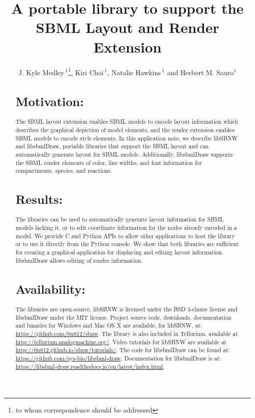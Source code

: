 \documentclass{bioinfo}
\begin{document}

\title[SBML Layout Library]{A portable library to support the SBML Layout and Render Extension}
\author[Medley \textit{et~al}]{J. Kyle Medley\,$^{1}$\footnote{to whom correspondence should be addressed}, Kiri Choi\,$^{1}$, Natalie Hawkins\,$^{1}$ and Herbert M. Sauro$^{1}$ }
\address{$^{1}$Department of Bioengineering, University of Washington, Seattle, WA 98195, USA.}

\maketitle

\begin{abstract}

\section{Motivation:}
The SBML layout extension enables SBML models to encode layout information which describes the graphical depiction of model 
elements, and the render extension enables SBML models to encode 
style elements. In this application note, we describe libSBNW 
and libsbmlDraw, portable libraries that support the SBML layout 
and can automatically generate layout for SBML models.  
Additionally, libsbmlDraw supports the SBML render elements 
of color, line widths, and font information for compartments, 
species, and reactions. 

\section{Results:}
The libraries can be used to automatically generate layout information for SBML models lacking it, or to edit coordinate information for the nodes already encoded in a model. We provide C and Python APIs to allow other applications to host the library or to use it directly from the Python console.  We show that both libraries are sufficient for creating a graphical application for displaying and editing layout information.  libsbmlDraw allows editing of render information.

\section{Availability:}
The libraries are open-source, libSBNW is licensed under the BSD 3-clause license and libsbmlDraw under the MIT license. Project source code, downloads, documentation and binaries for Windows and Mac OS X are available, for libSBNW, at: \href{https://github.com/0u812/sbnw}{https://github.com/0u812/sbnw}. The library is also included in Tellurium, available at \href{http://tellurium.analogmachine.org/}{http://tellurium.analogmachine.org/}.  
Video tutorials for libSBNW are available at \href{http://0u812.github.io/sbnw/tutorials/}{http://0u812.github.io/sbnw/tutorials/}.
The code for libsbmlDraw can be found at:
\href{https://github.com/sys-bio/libsbml-draw}{https://github.com/sys-bio/libsbml-draw}.
Documentation for libsbmlDraw is at:
\href{https://libsbml-draw.readthedocs.io/en/latest/index.html}{https://libsbml-draw.readthedocs.io/en/latest/index.html}.


\end{abstract}
\end{document}
